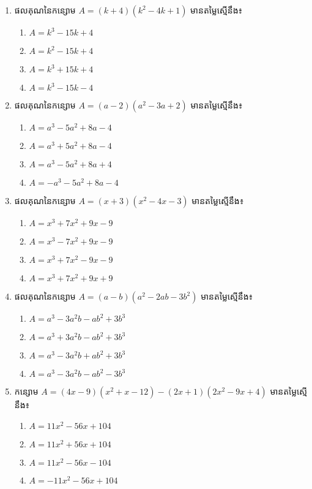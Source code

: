 \begin{enumerate}
\item ផលគុណនៃកន្សោម $A=(k+4)(k^2-4k+1)$ មានតម្លៃស្មើនឹង៖
\begin{multicols}{2}
\begin{enumerate}[label=\alph*.]
\item $A=k^3-15k+4$
\item $A=k^2-15k+4$
\item $A=k^3+15k+4$
\item $A=k^3-15k-4$
\end{enumerate}
\end{multicols}

\item ផលគុណនៃកន្សោម $A=(a-2)(a^2-3a+2)$ មានតម្លៃស្មើនឹង៖
\begin{multicols}{2}
\begin{enumerate}[label=\alph*.]
\item $A=a^3-5a^2+8a-4$
\item $A=a^3+5a^2+8a-4$
\item $A=a^3-5a^2+8a+4$
\item $A=-a^3-5a^2+8a-4$
\end{enumerate}
\end{multicols}

\item ផលគុណនៃកន្សោម $A=(x+3)(x^2-4x-3)$ មានតម្លៃស្មើនឹង៖
\begin{multicols}{2}
\begin{enumerate}[label=\alph*.]
\item $A=x^3+7x^2+9x-9$
\item $A=x^3-7x^2+9x-9$
\item $A=x^3+7x^2-9x-9$
\item $A=x^3+7x^2+9x+9$
\end{enumerate}
\end{multicols}

\item ផលគុណនៃកន្សោម $A=(a-b)(a^2-2ab-3b^2)$ មានតម្លៃស្មើនឹង៖
\begin{multicols}{2}
\begin{enumerate}[label=\alph*.]
\item $A=a^3-3a^2b-ab^2+3b^3$
\item $A=a^3+3a^2b-ab^2+3b^3$
\item $A=a^3-3a^2b+ab^2+3b^3$
\item $A=a^3-3a^2b-ab^2-3b^3$
\end{enumerate}
\end{multicols}

\item កន្សោម $A=(4x-9)(x^2+x-12)-(2x+1)(2x^2-9x+4)$ មានតម្លៃស្មើនឹង៖
\begin{multicols}{2}
\begin{enumerate}[label=\alph*.]
\item $A=11x^2-56x+104$
\item $A=11x^2+56x+104$
\item $A=11x^2-56x-104$
\item $A=-11x^2-56x+104$
\end{enumerate}
\end{multicols}


\end{enumerate}
